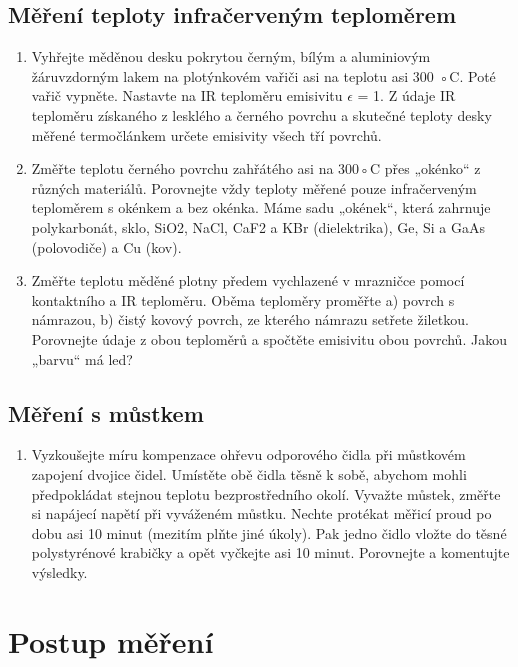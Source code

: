 \documentclass[a4paper,11pt]{article}
\begin{document}
\subsection{Měření teploty infračerveným teploměrem}

\begin{enumerate}
\item Vyhřejte měděnou desku pokrytou černým, bílým a aluminiovým žáruvzdorným lakem na
plotýnkovém vařiči asi na teplotu asi 300 ◦C. Poté vařič vypněte. Nastavte na IR teploměru
emisivitu $\epsilon$ = 1. Z údaje IR teploměru získaného z lesklého a černého povrchu a skutečné
teploty desky měřené termočlánkem určete emisivity všech tří povrchů. 
\item Změřte teplotu černého povrchu zahřátého asi na 300◦C přes „okénko“ z různých materiálů. Porovnejte vždy teploty měřené pouze
infračerveným teploměrem s okénkem a bez okénka. Máme sadu „okének“, která zahrnuje
polykarbonát, sklo, SiO2, NaCl, CaF2 a KBr (dielektrika), Ge, Si a GaAs (polovodiče) a
Cu (kov). 
\item Změřte teplotu měděné plotny předem vychlazené v mrazničce pomocí kontaktního a IR
teploměru. Oběma teploměry proměřte a) povrch s námrazou, b) čistý kovový povrch, ze
kterého námrazu setřete žiletkou. Porovnejte údaje z obou teploměrů a spočtěte emisivitu
obou povrchů. Jakou „barvu“ má led?

\end{enumerate}

\subsection{Měření s můstkem}

\begin{enumerate}
  \item Vyzkoušejte míru kompenzace ohřevu odporového čidla při můstkovém zapojení dvojice
čidel. Umístěte obě čidla těsně k sobě, abychom mohli předpokládat stejnou teplotu bezprostředního okolí. Vyvažte
můstek, změřte si napájecí napětí při vyváženém můstku. Nechte protékat měřicí proud po
dobu asi 10 minut (mezitím plňte jiné úkoly). Pak jedno čidlo vložte do těsné polystyrénové
krabičky a opět vyčkejte asi 10 minut. Porovnejte a komentujte výsledky.
 
\end{enumerate}

\section{Postup měření}
\end{document}

